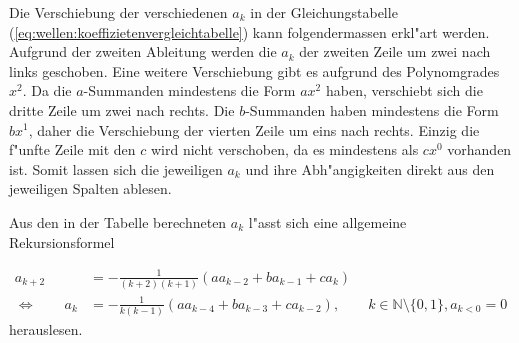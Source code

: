 Die Verschiebung der verschiedenen $a_k$ in der Gleichungstabelle 
(\ref{eq:wellen:koeffizietenvergleichtabelle}) kann folgendermassen erkl"art 
werden. Aufgrund der zweiten Ableitung werden die $a_k$ der zweiten Zeile um 
zwei nach links geschoben. Eine weitere Verschiebung gibt es aufgrund des 
Polynomgrades $x^2$. Da die $a$-Summanden mindestens die Form $ax^2$ haben, 
verschiebt sich die dritte Zeile um zwei nach rechts. Die $b$-Summanden haben 
mindestens die Form $bx^1$, daher die Verschiebung der vierten Zeile um eins 
nach rechts. Einzig die f"unfte Zeile mit den $c$ wird nicht verschoben, da es 
mindestens als $cx^0$ vorhanden ist. Somit lassen sich die jeweiligen $a_k$ und 
ihre Abh"angigkeiten direkt aus den jeweiligen Spalten ablesen.

Aus den in der Tabelle berechneten $a_k$ l"asst sich eine allgemeine 
Rekursionsformel

\begin{equation*}
	\begin{split}
		a_{k+2} &= -\frac{1}{(k+2)(k+1)} (aa_{k-2}+ba_{k-1}+ca_k) \\
		\Leftrightarrow \qquad
		a_k &= -\frac{1}{k(k-1)} (aa_{k-4}+ba_{k-3}+ca_{k-2}), \qquad k \in 
		\mathbb{N} \setminus \{0, 1\}, a_{k<0} = 0
	\end{split}
\end{equation*}
herauslesen.